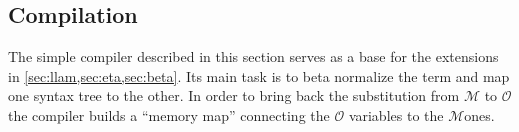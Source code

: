 \documentclass[sigconf,natbib=false,review]{acmart}
\newcommand{\llambda}{\ensuremath{\mathcal{L}}\xspace}
\newcommand{\Fo}{\texorpdfstring{\ensuremath{\mathcal{O}}\xspace}{O}}
\newcommand{\Ho}{\texorpdfstring{\ensuremath{\mathcal{M}}\xspace}{M}}
\begin{document}







\subsection{Compilation}
\label{sec:compilation}

The simple compiler described in this section serves as a base for the
extensions in \cref{sec:llam,sec:eta,sec:beta}.
Its main task is to beta normalize the term and map one syntax tree to
the other.
In order to bring back the substitution from \Ho{} to \Fo{} the compiler
builds a ``memory map'' connecting the \Fo{} variables to the \Ho ones.
\end{document}
